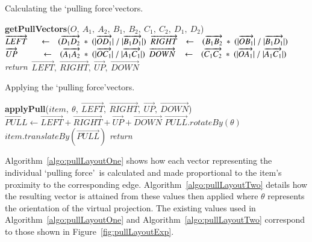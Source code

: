 \documentclass[review,5p,times,twocolumn]{elsarticle}
\newcommand{\INDSTATE}[1][1]{\STATE\hspace{#1\algorithmicindent}}
\begin{document}
\begin{algorithm}[h]
\caption{Calculating the \lq pulling force\rq vectors.}
\label{algo:pullLayoutOne}
\begin{algorithmic}
\STATE \textbf{getPullVectors}($O,\ A_{1},\ A_{2},\ B_{1},\ B_{2},\ C_{1},\ C_{2},\ D_{1},\ D_{2}$)
\INDSTATE[2]$\overrightarrow{LEFT}\hspace{0.5cm} \leftarrow \hspace{0.25cm}(\overrightarrow{D_{1}D_{2}}\ *\ ( |\overrightarrow{OD_{1}}|\  /\ |\overrightarrow{B_{1}D_{1}}| )$
\INDSTATE[2]$\overrightarrow{RIGHT}\hspace{0.25cm} \leftarrow \hspace{0.25cm}(\overrightarrow{B_{1}B_{2}}\ *\ ( |\overrightarrow{OB_{1}}|\  /\ |\overrightarrow{B_{1}D_{1}}| )$
\INDSTATE[2]$\overrightarrow{UP}\hspace{1cm} \leftarrow \hspace{0.25cm}(\overrightarrow{A_{1}A_{2}}\ *\ ( |\overrightarrow{OC_{1}}|\  /\ |\overrightarrow{A_{1}C_{1}}| )$
\INDSTATE[2]$\overrightarrow{DOWN}\hspace{0.3cm} \leftarrow \hspace{0.25cm}(\overrightarrow{C_{1}C_{2}}\ *\ ( |\overrightarrow{OA_{1}}|\  /\ |\overrightarrow{A_{1}C_{1}}| )$
\STATE \textit{return}\ $\overrightarrow{LEFT},\ \overrightarrow{RIGHT},\ \overrightarrow{UP},\ \overrightarrow{DOWN}$
\end{algorithmic}
\end{algorithm}

\begin{algorithm}[h!]
\caption{Applying the \lq pulling force\rq vectors.}
\label{algo:pullLayoutTwo}
\begin{algorithmic}
\STATE \textbf{applyPull}($item,\ \theta,\ \overrightarrow{LEFT},\ \overrightarrow{RIGHT},\ \overrightarrow{UP},\ \overrightarrow{DOWN}$)
\INDSTATE[2]$\overrightarrow{PULL} \leftarrow \overrightarrow{LEFT} + \overrightarrow{RIGHT} + \overrightarrow{UP} + \overrightarrow{DOWN}$
\INDSTATE[2]$\overrightarrow{PULL}.rotateBy(\theta)$
\INDSTATE[2]$item.translateBy(\overrightarrow{PULL})$
\STATE \textit{return}
\end{algorithmic}
\end{algorithm}

Algorithm~\ref{algo:pullLayoutOne} shows how each vector representing the individual \lq pulling force\rq\ is calculated and made proportional to the item's proximity to the corresponding edge.
Algorithm~\ref{algo:pullLayoutTwo} details how the resulting vector is attained from these values then applied where $\theta$ represents the orientation of the virtual projection.
The existing values used in Algorithm~\ref{algo:pullLayoutOne} and Algorithm~\ref{algo:pullLayoutTwo} correspond to those shown in Figure~\ref{fig:pullLayoutExp}.
\end{document}
